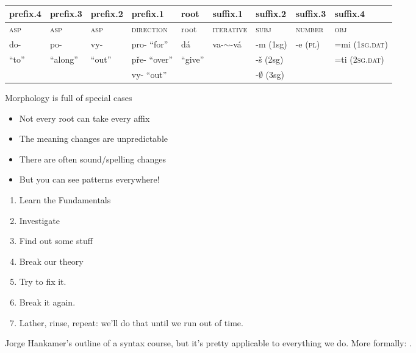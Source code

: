 \documentclass[a4paper,landscape,headrule,footrule]{foils}
\begin{document}


\bigskip

\hspace*{-4em}
{\small
\begin{tabular}{|l|l|l|l|l|l|l|l|l|}
\hline
prefix.4	& prefix.3		& prefix.2		& prefix.1		& root 	& suffix.1 		& suffix.2	& suffix.3	& suffix.4\\
\hline
\textsc{asp} 	& \textsc{asp} 	& \textsc{asp} 	& \textsc{direction} 	& root 	& \textsc{iterative} 	& \textsc{subj}	& \textsc{number} 	& \textsc{obj}\\
 do- 	& po- & vy- & pro- ``for'' & dá 	& va-$\sim$-vá & -m (1sg) & -e (\textsc{pl}) & =mi (\textsc{1sg.dat}) \\
``to''	& ``along'' 	& ``out''  & pře- ``over'' & ``give'' 	& 			& -š (2sg) & 			 & =ti (\textsc{2sg.dat}) \\
	&  	&  	& vy- ``out'' &  	& 			& -$\emptyset$ (3sg) & 			 & 					 \\	
\hline
\end{tabular}}

Morphology is full of special cases

\begin{itemize}
\item Not every root can take every affix
\item The meaning changes are unpredictable
\item There are often sound/spelling changes
\item But you can see patterns everywhere!
\end{itemize}

  
\begin{enumerate}\addtolength{\itemsep}{-1ex}
\item Learn the Fundamentals
\item Investigate
\item Find out some stuff
\item Break our theory
\item Try to fix it.
\item Break it again.
\item Lather, rinse, repeat: we'll do that until we run out of time.
\end{enumerate}

Jorge Hankamer's outline of a syntax course, but it's pretty
applicable to everything we do.  More formally: .
\end{document}
